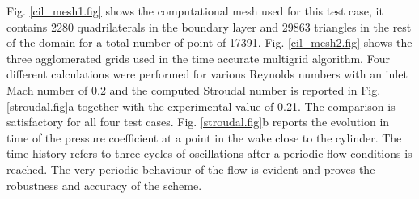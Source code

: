  Fig. \ref{cil_mesh1.fig} shows the computational mesh used for this test case,
 it contains 2280 quadrilaterals in the boundary layer and 29863
 triangles in the rest of the domain for a total number of point of 17391.
 Fig. \ref{cil_mesh2.fig} shows the three agglomerated grids used in the time
 accurate multigrid algorithm.
 Four different calculations were performed for various Reynolds numbers
 with an inlet Mach number of 0.2
 and the computed Stroudal number is reported in Fig. \ref{stroudal.fig}a together
 with the experimental value of 0.21. The comparison is satisfactory for
 all four test cases.
 Fig. \ref{stroudal.fig}b reports the evolution in time of the pressure coefficient
 at a point in the wake close to the cylinder. The time history refers to three cycles of
 oscillations after a periodic flow conditions is reached. The very periodic behaviour
 of the flow is evident and proves the robustness and accuracy of the scheme.
%
